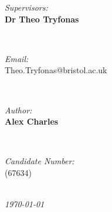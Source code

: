 \documentclass[10pt]{article}
\makeatletter
\newcommand{\StudentNameA}{Alex Charles}
\newcommand{\StudentNumberA}{67634}
\newcommand{\SupervisorNameA}{Dr Theo Tryfonas}
\newcommand{\SupervisorEmailA}{Theo.Tryfonas@bristol.ac.uk}
\makeatother
\begin{document}
\begin{titlepage}
\begin{minipage}{0.4\textwidth}
\begin{flushleft} \large
\emph{Supervisors:}\\
\textbf{\SupervisorNameA}\\
\end{flushleft}
\end{minipage}
~
\begin{minipage}{0.4\textwidth}
\begin{flushright} \large
\emph{Email:} \\
\SupervisorEmailA\\

\end{flushright}
\end{minipage}\\[1cm]

\begin{minipage}{0.4\textwidth}
\begin{flushleft} \large
\emph{Author:}\\
	\textbf{\StudentNameA}
\end{flushleft}
\end{minipage}
~
\begin{minipage}{0.4\textwidth}
\begin{flushright} \large
\emph{Candidate Number:} \\
(\StudentNumberA)\\
\end{flushright}
\end{minipage}\\[2cm]

\textit{{\large \today}}\\[1cm] %
\vfill %
\end{titlepage}


\newpage
\end{document}
